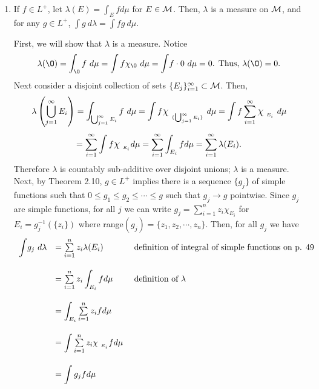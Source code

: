 \begin{enumerate}
	\item If $f \in L^+$, let $\lambda(E)=\int_E f d\mu$ for $E \in {\mathcal M}$. Then, $\lambda$ is a measure on ${\mathcal M}$, and for any $g \in L^+$, $\int g \ d\lambda=\int fg\  d \mu$.
\begin{pf}
	First, we will show that $\lambda$ is a measure. Notice 
	\[
	\lambda(\O) = \mathop{\mathlarger{\int}_{\O}}f \ d\mu = \mathop{\mathlarger{\int}}f \chi_{\O} \ d\mu =\mathlarger{\int}f\cdot0 \ d\mu=0\text{. Thus, }\lambda(\O)=0.
	\] Next consider a disjoint collection of sets $\{E_j\}_{i=1}^\infty \subset {\mathcal M}$. Then, 
	\[
	\lambda\left( \bigcup_{j=1}^\infty E_i \right)=\mathop{\mathlarger{\int}_{\bigcup_{j=1}^\infty E_i}}f \ d\mu=\mathop{\mathlarger{\int}}f \mathlarger{\chi}_{\ _{\{\bigcup_{j=1}^\infty E_i\}}} \ d\mu= \mathop{\mathlarger{\int}}f \sum_{i=1}^\infty \mathlarger{\chi}_{\ _{E_i}} \ d\mu
	\]
	\[
	= \sum_{i=1}^\infty\mathop{\mathlarger{\int}}f\mathlarger{\chi}_{\ _{E_i}} d\mu=\sum_{i=1}^\infty\mathop{\mathlarger{\int}_{E_i}}f d\mu=\sum_{i=1}^\infty\lambda(E_i).
	\]
	Therefore $\lambda$ is countably sub-additive over disjoint unions; $\lambda$ is a measure.\\
	Next, by Theorem 2.10, $g \in L^+$ implies there is a sequence $\{g_j\}$ of simple functions such that $0 \leq g_1 \leq g_2 \leq \cdots \leq g$ such that $g_j \rightarrow g$ pointwise. Since $g_j$ are simple functions, for all $j$ we can write $g_j=\sum_{i=1}^nz_i \chi_{E_i}$ for $E_i=g_j^{-1}(\{z_i\})$ where range$(g_j)=\{z_1, z_2, \cdots, z_n\}$. Then, for all $g_j$ we have 
	\[
	\begin{array}{lll}
		\vspace{5mm}
	\mathlarger{\int}g_j \ d\lambda & = \sum\limits_{i=1}^n z_i \lambda(E_i) & \text{ definition of integral of simple functions on p. 49}\\
	\vspace{5mm}
	 &= \sum\limits_{i=1}^n z_i \mathop{\mathlarger{\int}_{E_i}}f d\mu &\text{ definition of } \lambda \\
	 \vspace{5mm}
	 &= \mathop{\mathlarger{\int}_{E_i}}\sum\limits_{i=1}^n z_i f d\mu & \\
	 	\vspace{5mm}
	 	 &= \mathop{\mathlarger{\int}}\sum\limits_{i=1}^n z_i \mathlarger{\chi}_{\ _{E_i}} f d\mu & \\
	 	\vspace{5mm}
	 	 &= \mathop{\mathlarger{\int}}g_j f d\mu & \\

\end{array}\]
\end{pf}
\end{enumerate}
